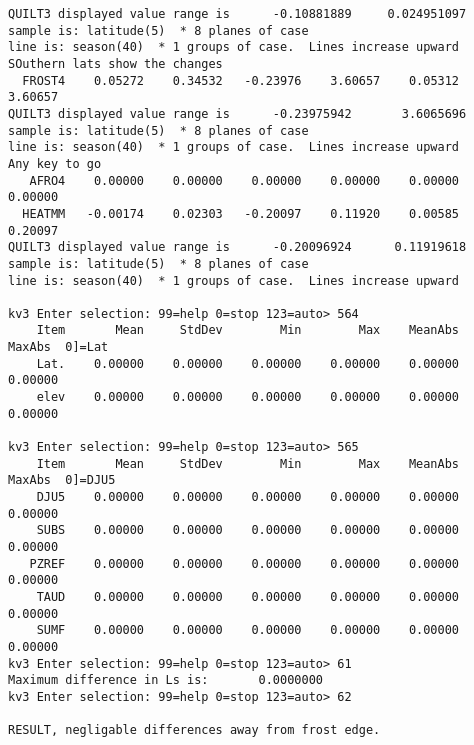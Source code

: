 \documentclass{article}
\begin{document}
\begin{verbatim}
QUILT3 displayed value range is      -0.10881889     0.024951097
sample is: latitude(5)  * 8 planes of case
line is: season(40)  * 1 groups of case.  Lines increase upward
SOuthern lats show the changes
  FROST4    0.05272    0.34532   -0.23976    3.60657    0.05312    3.60657
QUILT3 displayed value range is      -0.23975942       3.6065696
sample is: latitude(5)  * 8 planes of case
line is: season(40)  * 1 groups of case.  Lines increase upward
Any key to go
   AFRO4    0.00000    0.00000    0.00000    0.00000    0.00000    0.00000
  HEATMM   -0.00174    0.02303   -0.20097    0.11920    0.00585    0.20097
QUILT3 displayed value range is      -0.20096924      0.11919618
sample is: latitude(5)  * 8 planes of case
line is: season(40)  * 1 groups of case.  Lines increase upward

kv3 Enter selection: 99=help 0=stop 123=auto> 564
    Item       Mean     StdDev        Min        Max    MeanAbs     MaxAbs  0]=Lat
    Lat.    0.00000    0.00000    0.00000    0.00000    0.00000    0.00000
    elev    0.00000    0.00000    0.00000    0.00000    0.00000    0.00000

kv3 Enter selection: 99=help 0=stop 123=auto> 565
    Item       Mean     StdDev        Min        Max    MeanAbs     MaxAbs  0]=DJU5
    DJU5    0.00000    0.00000    0.00000    0.00000    0.00000    0.00000
    SUBS    0.00000    0.00000    0.00000    0.00000    0.00000    0.00000
   PZREF    0.00000    0.00000    0.00000    0.00000    0.00000    0.00000
    TAUD    0.00000    0.00000    0.00000    0.00000    0.00000    0.00000
    SUMF    0.00000    0.00000    0.00000    0.00000    0.00000    0.00000
kv3 Enter selection: 99=help 0=stop 123=auto> 61
Maximum difference in Ls is:       0.0000000
kv3 Enter selection: 99=help 0=stop 123=auto> 62

RESULT, negligable differences away from frost edge.

\end{verbatim}  
 
\end{document}
